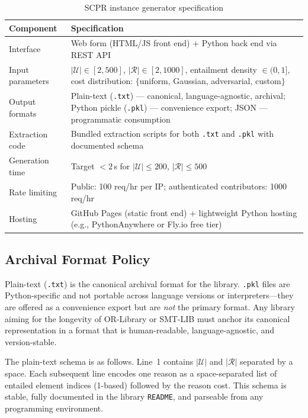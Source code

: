 \documentclass[11pt,a4paper]{report}
\newcommand{\calU}{\mathcal{U}}
\newcommand{\calR}{\mathcal{R}}
\begin{document}
\begin{table}[htbp]
\centering
\caption{SCPR instance generator specification}
\label{tab:genspec}
\begin{tabular}{@{}lp{9cm}@{}}
\toprule
\textbf{Component} & \textbf{Specification} \\
\midrule
Interface &
  Web form (HTML/JS front end) + Python back end via REST API \\
Input parameters &
  $|\calU| \in [2, 500]$,\; $|\calR| \in [2, 1000]$,\;
  entailment density $\in (0, 1]$,\; cost distribution:
  $\{$uniform, Gaussian, adversarial, custom$\}$ \\
Output formats &
  Plain-text (\texttt{.txt}) --- canonical, language-agnostic, archival;
  Python pickle (\texttt{.pkl}) --- convenience export;
  JSON --- programmatic consumption \\
Extraction code &
  Bundled extraction scripts for both \texttt{.txt} and \texttt{.pkl} with
  documented schema \\
Generation time &
  Target $< 2$\,s for $|\calU| \leq 200$,\; $|\calR| \leq 500$ \\
Rate limiting &
  Public: 100 req/hr per IP;\; authenticated contributors: 1000 req/hr \\
Hosting &
  GitHub Pages (static front end) + lightweight Python hosting
  (e.g., PythonAnywhere or Fly.io free tier) \\
\bottomrule
\end{tabular}
\end{table}

\subsection{Archival Format Policy}

\begin{tcolorbox}[enhanced, colback=lightblue!40, colframe=royalblue, arc=4pt,
  fonttitle=\bfseries, title={Format Principle}]
Plain-text (\texttt{.txt}) is the canonical archival format for the library.
\texttt{.pkl} files are Python-specific and not portable across language versions or
interpreters---they are offered as a convenience export but are \emph{not} the primary
format. Any library aiming for the longevity of OR-Library or SMT-LIB must anchor its
canonical representation in a format that is human-readable, language-agnostic, and
version-stable.
\end{tcolorbox}

The plain-text schema is as follows. Line~1 contains $|\calU|$ and $|\calR|$ separated by
a space. Each subsequent line encodes one reason as a space-separated list of entailed
element indices (1-based) followed by the reason cost. This schema is stable, fully
documented in the library \texttt{README}, and parseable from any programming environment.
\end{document}
